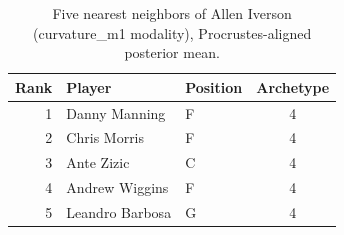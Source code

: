 \begin{table}[htbp]
  \centering\small
  \begin{tabular}{rllc}
    \toprule
    Rank & Player & Position & Archetype \\
    \midrule
    1 & Danny Manning & F & 4 \\
    2 & Chris Morris & F & 4 \\
    3 & Ante Zizic & C & 4 \\
    4 & Andrew Wiggins & F & 4 \\
    5 & Leandro Barbosa & G & 4 \\
    \bottomrule
  \end{tabular}
  \caption{Five nearest neighbors of Allen Iverson (curvature_m1 modality), Procrustes-aligned posterior mean.}
  \label{tab:Allen_Iverson_neighbors_curvature_m1}
\end{table}

